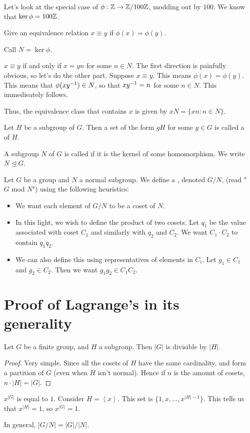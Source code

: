 \documentclass[11pt]{scrreport}
\begin{document}
Let's look at the special case of $\phi : \mathbb Z \to \mathbb Z/100\mathbb Z$, modding out by $100$. We know that $\ker\phi = 100\mathbb Z$. 
\begin{definition}
    Give an equivalence relation $x \equiv y$ if $\phi(x) = \phi(y)$.
\end{definition}
Call $N = \ker\phi$.
\begin{remark}
    $x\equiv y$ if and only if $x=yn$ for some $n\in N$. The first direction is painfully obvious, so let's do the other part. Suppose $x\equiv y$. This means $\phi(x)=\phi(y)$. This means that $\phi(xy^{-1}) \in N$, so that $xy^{-1} = n$ for some $n\in N$. This immedieately follows.

    Thus, the equivalence class that contains $x$ is given by $xN = \{xn : n\in N\}$.
\end{remark}
\begin{definition}
    Let $H$ be a subgroup of $G$. Then a set of the form $gH$ for some $g\in G$ is called a  of $H$.
\end{definition}
\begin{definition}
    A subgroup $N$ of $G$ is called  if it is the kernel of some homomorphism. We write $N\unlhd G$.
\end{definition}
\begin{definition}
    Let $G$ be a group and $N$ a normal subgroup. We define a , denoted $G/N$, (read "$G$ mod $N$") using the following heuristics:
    \begin{itemize}
        \item We want each element of $G/N$ to be a coset of $N$.
        \item In this light, we wish to define the product of two cosets. Let $q_1$ be the value associated with coset $C_1$ and similarly with $q_2$ and $C_2$. We want $C_1\cdot C_2$ to contain $q_1q_2$.
        \item We can also define this using representatives of elements in $C_i$. Let $g_1\in C_1$ and $g_2\in C_2$. Then we want $g_1g_2\in C_1C_2$.
    \end{itemize}
\end{definition}
\section{Proof of Lagrange's in its generality}
\begin{theorem}
    Let $G$ be a finite group, and $H$ a subgroup. Then $|G|$ is divisible by $|H|$.
\end{theorem}
\begin{proof}
    Very simple. Since all the cosets of $H$ have the same cardinality, and form a partition of $G$ (even when $H$ isn't normal). Hence if $n$ is the amount of cosets, $n\cdot |H| = |G|$.
\end{proof}
\begin{remark}
    $x^|G|$ is equal to $1$. Consider $H = \left<x\right>$. This set is $\{1,x,\dots, x^{|H|-1}\}$. This tells us that $x^{|H|} = 1$, so $x^{|G|}=1$.
\end{remark}
\begin{remark}
    In general, $|G/N|=|G|/|N|$.
\end{remark}
\end{document}

